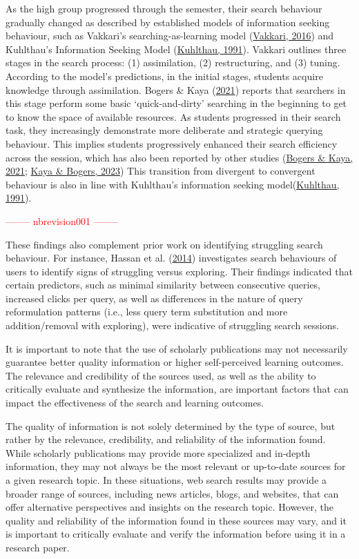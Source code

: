 \documentclass[letterpaper, nobind]{templates/ociamthesis}
\begin{document}
As the high group progressed through the semester, their search behaviour gradually changed as described by established models of information seeking behaviour, such as Vakkari's searching-as-learning model (\protect\hyperlink{ref-vakkari2016searching}{Vakkari, 2016}) and Kuhlthau's Information Seeking Model (\protect\hyperlink{ref-kuhlthau1991inside}{Kuhlthau, 1991}).
Vakkari outlines three stages in the search process:
(1) assimilation,
(2) restructuring, and
(3) tuning.
According to the model's predictions, in the initial stages, students acquire knowledge through assimilation.
Bogers \& Kaya (\protect\hyperlink{ref-bogers2021exploration}{2021}) reports that searchers in this stage perform some basic `quick-and-dirty' searching in the beginning to get to know the space of available resources.
As students progressed in their search task, they increasingly demonstrate more deliberate and strategic querying behaviour.
This implies students progressively enhanced their search efficiency across the session, which has also been reported by other studies (\protect\hyperlink{ref-bogers2021exploration}{Bogers \& Kaya, 2021}; \protect\hyperlink{ref-kaya2023understanding}{Kaya \& Bogers, 2023})
This transition from divergent to convergent behaviour is also in line with Kuhlthau's information seeking model(\protect\hyperlink{ref-kuhlthau1991inside}{Kuhlthau, 1991}).

\textcolor{red}{-------- nbrevision001 --------}

These findings also complement prior work on identifying struggling search behaviour.
For instance, Hassan et al. (\protect\hyperlink{ref-hassan2014struggling}{2014}) investigates search behaviours of users to identify signs of struggling versus exploring.
Their findings indicated that certain predictors, such as minimal similarity between consecutive queries, increased clicks per query, as well as differences in the nature of query reformulation patterns (i.e., less query term substitution and more addition/removal with exploring), were indicative of struggling search sessions.

It is important to note that the use of scholarly publications may not necessarily guarantee better quality information or higher self-perceived learning outcomes.
The relevance and credibility of the sources used, as well as the ability to critically evaluate and synthesize the information, are important factors that can impact the effectiveness of the search and learning outcomes.

The quality of information is not solely determined by the type of source, but rather by the relevance, credibility, and reliability of the information found.
While scholarly publications may provide more specialized and in-depth information, they may not always be the most relevant or up-to-date sources for a given research topic.
In these situations, web search results may provide a broader range of sources, including news articles, blogs, and websites, that can offer alternative perspectives and insights on the research topic.
However, the quality and reliability of the information found in these sources may vary, and it is important to critically evaluate and verify the information before using it in a research paper.
\end{document}
